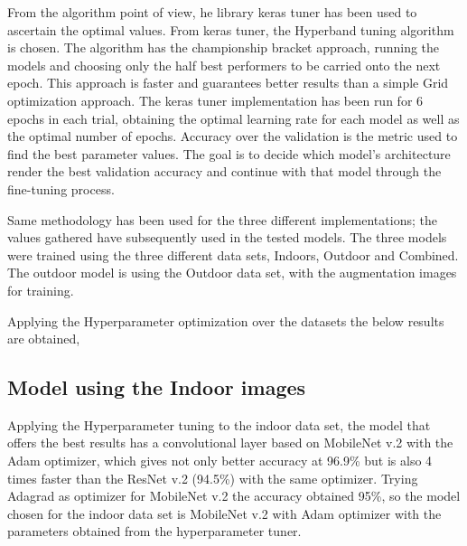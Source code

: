 \documentclass[conference]{IEEEtran}
\begin{document}
From the algorithm point of view, he library keras tuner has been used to ascertain the optimal values. From keras tuner, the Hyperband tuning algorithm is chosen. The algorithm has the championship bracket approach, running the models and choosing only the half best performers to be carried onto the next epoch.  This approach is faster and guarantees better results than a simple Grid optimization approach.  The keras tuner implementation has been run for 6 epochs in each trial, obtaining the optimal learning rate for each model as well as the optimal number of epochs.  Accuracy over the validation is the metric used to find the best parameter values. The goal is to decide which model’s architecture render the best validation accuracy and continue with that model through the fine-tuning process.\ 

Same methodology has been used for the three different implementations; the values gathered have subsequently used in the tested models. The three models were trained using the three different data sets, Indoors, Outdoor and Combined. The outdoor model is using the Outdoor data set, with the augmentation images for training. \

 

Applying the Hyperparameter optimization over the datasets the below results are obtained, 

\subsection{Model using the Indoor images}
Applying the Hyperparameter tuning to the indoor data set, the model that offers the best results has a convolutional layer based on MobileNet v.2 with the Adam optimizer, which gives not only better accuracy at 96.9\% but is also 4 times faster than the ResNet v.2 (94.5\%) with the same optimizer. Trying Adagrad as optimizer for MobileNet v.2  the accuracy obtained 95\%, so the model chosen for the indoor data set is MobileNet v.2 with Adam optimizer with the parameters obtained from the hyperparameter tuner. 
\end{document}
